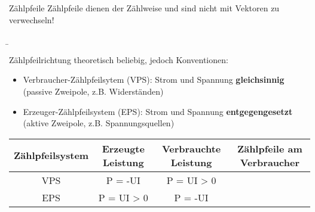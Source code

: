 \begin{frame}
{		
		\begin{Merksatz}{Zählpfeile}
			Zählpfeile dienen der Zählweise und sind nicht mit Vektoren zu verwechseln!
		\end{Merksatz}
		
	}
	
	
	
	\b{
		Zählpfeilrichtung theoretisch beliebig, jedoch Konventionen: 
		\begin{itemize}
			\item Verbraucher-Zählpfeilsytem (VPS): Strom und Spannung \textbf{gleichsinnig}\\
			      (passive Zweipole, z.B. Widerständen)
			\item Erzeuger-Zählpfeilsystem (EPS): Strom und Spannung \textbf{entgegengesetzt}\\
			      (aktive Zweipole, z.B. Spannungsquellen)
		\end{itemize}
		
		
		
		\begin{table}[h!]
			\centering
			\begin{tabular}{|c|c|c|c|}
				\hline
				Zählpfeilsystem & Erzeugte Leistung & Verbrauchte Leistung & Zählpfeile am Verbraucher                                                      \\ \hline
				VPS             & P = -UI           & P = UI > 0           &  \\ \hline
				EPS             & P = UI > 0        & P = -UI              &  \\ \hline
			\end{tabular}
			
		\end{table}
		
		}
\end{frame}
